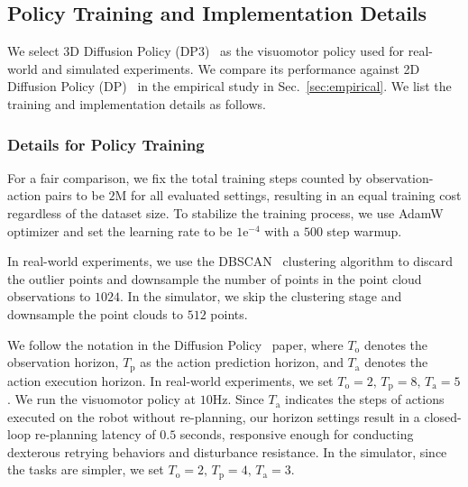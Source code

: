\clearpage
\newpage
\begin{appendix}




\subsection{Policy Training and Implementation Details}
\label{sec:appendix-policy}

We select 3D Diffusion Policy (DP3)~\cite{ze20243d} as the visuomotor policy used for real-world and simulated experiments. We compare its performance against 2D Diffusion Policy (DP)~\cite{chi2023diffusion_policy} in the empirical study in Sec.~\ref{sec:empirical}. We list the training and implementation details as follows.

\vspace{0.2cm}\subsubsection{Details for Policy Training} 
\label{sec:appendix-policy-training}
For a fair comparison, we fix the total training steps counted by observation-action pairs to be $2\mathrm{M}$ for all evaluated settings, resulting in an equal training cost regardless of the dataset size. 
To stabilize the training process, we use AdamW~\cite{loshchilov2017decoupled} optimizer and set the learning rate to be $1\mathrm{e}^{-4}$ with a $500$ step warmup.

In real-world experiments, we use the DBSCAN~\cite{ester1996density} clustering algorithm to discard the outlier points and downsample the number of points in the point cloud observations to $1024$. In the simulator, we skip the clustering stage and downsample the point clouds to $512$ points.

We follow the notation in the Diffusion Policy~\cite{chi2023diffusion_policy} paper, where $T_\mathrm{o}$ denotes the observation horizon, $T_\mathrm{p}$ as the action prediction horizon, and $T_\mathrm{a}$ denotes the action execution horizon. 
In real-world experiments, we set $T_\mathrm{o}=2,\,T_\mathrm{p}=8,\,T_\mathrm{a}=5$. We run the visuomotor policy at $10\mathrm{Hz}$. Since $T_\mathrm{a}$ indicates the steps of actions executed on the robot without re-planning, our horizon settings result in a closed-loop re-planning latency of $0.5$ seconds, responsive enough for conducting dexterous retrying behaviors and disturbance resistance.
In the simulator, since the tasks are simpler, we set $T_\mathrm{o}=2,\,T_\mathrm{p}=4,\,T_\mathrm{a}=3$.


\end{appendix}

